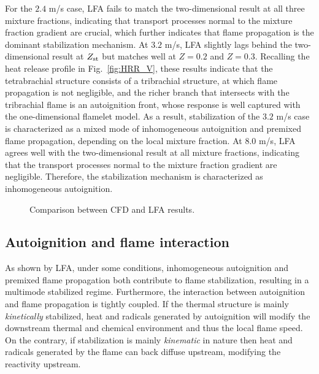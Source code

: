 \documentclass[review,3p,times]{elsarticle}
\begin{document}
For the $2.4$ m/s case, LFA fails to match the two-dimensional result at all three mixture fractions, indicating that transport processes normal to the mixture fraction gradient are crucial, which further indicates that flame propagation is the dominant stabilization mechanism.  At $3.2$ m/s, LFA slightly lags behind the two-dimensional result at $Z_{\rm st}$ but matches well at $Z = 0.2$ and $Z = 0.3$.  Recalling the heat release profile in Fig.~\ref{fig:HRR_V}, these results indicate that the tetrabrachial structure consists of a tribrachial structure, at which flame propagation is not negligible, and the richer branch that intersects with the tribrachial flame is an autoignition front, whose response is well captured with the one-dimensional flamelet model.  As a result, stabilization of the $3.2$ m/s case is characterized as a mixed mode of inhomogeneous autoignition and premixed flame propagation, depending on the local mixture fraction.  At $8.0$ m/s, LFA agrees well with the two-dimensional result at all mixture fractions, indicating that the transport processes normal to the mixture fraction gradient are negligible.  Therefore, the stabilization mechanism is characterized as inhomogeneous autoignition.

\begin{figure}
  \centering
  \scriptsize
  \resizebox{1.0\textwidth}{!}{}
  \normalsize
  \vspace{-0.2in}
  \caption{Comparison between CFD and LFA results.}
  \label{fig:LFA_V}
\end{figure}

\subsection{Autoignition and flame interaction}

As shown by LFA, under some conditions, inhomogeneous autoignition and premixed flame propagation both contribute to flame stabilization, resulting in a multimode stabilized regime.  Furthermore, the interaction between autoignition and flame propagation is tightly coupled.  If the thermal structure is mainly \emph{kinetically} stabilized, heat and radicals generated by autoignition will modify the  downstream thermal and chemical environment and thus the local flame speed.  On the contrary, if stabilization is mainly \emph{kinematic} in nature then heat and radicals generated by the flame can back diffuse upstream, modifying the reactivity upstream.  
\end{document}
